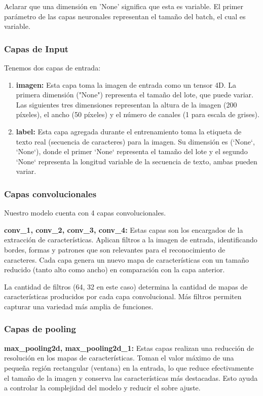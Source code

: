 \documentclass{article}
\begin{document}
Aclarar que una dimensión en 'None' significa que esta es variable. El primer parámetro de las capas neuronales representan el tamaño del batch, el cual es variable.


\subsubsection{Capas de Input}
Tenemos dos capas de entrada:
\begin{enumerate}
    \item \textbf{imagen: } Esta capa toma la imagen de entrada como un tensor 4D. La primera dimensión ("None") representa el tamaño del lote, que puede variar. Las siguientes tres dimensiones representan la altura de la imagen (200 píxeles), el ancho (50 píxeles) y el número de canales (1 para escala de grises).
\item \textbf{label: } Esta capa agregada durante el entrenamiento toma la etiqueta de texto real (secuencia de caracteres) para la imagen. Su dimensión es (`None`, `None`), donde el primer `None` representa el tamaño del lote y el segundo `None` representa la longitud variable de la secuencia de texto, ambas pueden variar.
\end{enumerate}

\subsubsection{Capas convolucionales}
Nuestro modelo cuenta con 4 capas convolucionales.

\textbf{conv\_1, conv\_2, conv\_3, conv\_4:} Estas capas son los encargados de la extracción de características. Aplican filtros a la imagen de entrada, identificando bordes, formas y patrones que son relevantes para el reconocimiento de caracteres. Cada capa genera un nuevo mapa de características con un tamaño reducido (tanto alto como ancho) en comparación con la capa anterior.

La cantidad de filtros (64, 32 en este caso) determina la cantidad de mapas de características producidos por cada capa convolucional. Más filtros permiten capturar una variedad más amplia de funciones.

\subsubsection{Capas de pooling}
\textbf{max\_pooling2d, max\_pooling2d\_1:} Estas capas realizan una reducción de resolución en los mapas de características. Toman el valor máximo de una pequeña región rectangular (ventana) en la entrada, lo que reduce efectivamente el tamaño de la imagen y conserva las características más destacadas. Esto ayuda a controlar la complejidad del modelo y reducir el sobre ajuste.
\end{document}
